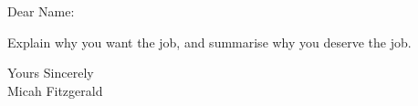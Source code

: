 \documentclass[a4paper,english]{friggeri-letter}
\begin{document}

\address{ 
   5608 Avenue F\\
   Apt \#111 \\
   Austin, TX 78751
}




   
  

\opening{Dear Name:} 

Explain why you want the job, and summarise why you deserve the job.


\closing{
   Yours Sincerely\\
   Micah Fitzgerald} 
\end{document}
